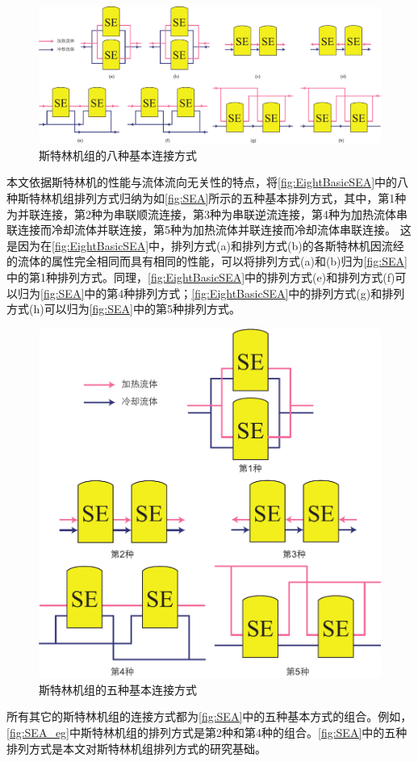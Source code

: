 \begin{figure}[htbp]
	\centering
	\includegraphics[width = 0.9\columnwidth]{fig/EightBasicSEA}
	\caption{斯特林机组的八种基本连接方式}
	\label{fig:EightBasicSEA}
\end{figure}

本文依据斯特林机的性能与流体流向无关性的特点，将\autoref{fig:EightBasicSEA}中的八种斯特林机组排列方式归纳为如\autoref{fig:SEA}所示的五种基本排列方式，其中，第1种为并联连接，第2种为串联顺流连接，第3种为串联逆流连接，第4种为加热流体串联连接而冷却流体并联连接，第5种为加热流体并联连接而冷却流体串联连接。
这是因为在\autoref{fig:EightBasicSEA}中，排列方式(a)和排列方式(b)的各斯特林机因流经的流体的属性完全相同而具有相同的性能，可以将排列方式(a)和(b)归为\autoref{fig:SEA}中的第1种排列方式。同理，\autoref{fig:EightBasicSEA}中的排列方式(e)和排列方式(f)可以归为\autoref{fig:SEA}中的第4种排列方式；\autoref{fig:EightBasicSEA}中的排列方式(g)和排列方式(h)可以归为\autoref{fig:SEA}中的第5种排列方式。

\begin{figure}[htbp]
\centering
	\includegraphics[width = 0.45\columnwidth]{fig/BasicSEA}
	\caption{斯特林机组的五种基本连接方式}
	\label{fig:SEA}
\end{figure}

所有其它的斯特林机组的连接方式都为\autoref{fig:SEA}中的五种基本方式的组合。例如，\autoref{fig:SEA_eg}中斯特林机组的排列方式是第2种和第4种的组合。\autoref{fig:SEA}中的五种排列方式是本文对斯特林机组排列方式的研究基础。

